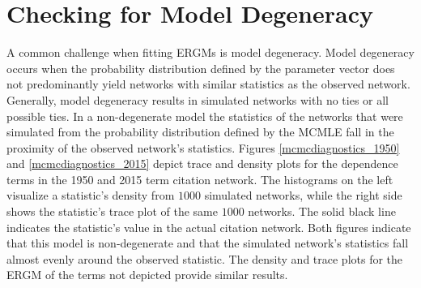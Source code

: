 \documentclass{cup-pan}
\begin{document}
\section{Checking for Model Degeneracy}

A common challenge when fitting ERGMs is model degeneracy. Model degeneracy occurs when the probability distribution defined by the parameter vector does not predominantly yield networks with similar statistics as the observed network. Generally, model degeneracy results in simulated networks with no ties or all possible ties. In a non-degenerate model the statistics of the networks that were simulated from the probability distribution defined by the MCMLE fall in the proximity of the observed network's statistics. Figures \ref{mcmcdiagnostics_1950} and \ref{mcmcdiagnostics_2015} depict trace and density plots for the dependence terms in the 1950 and 2015 term citation network. The histograms on the left visualize a statistic's density from $1000$ simulated networks, while the right side shows the statistic's trace plot of the same $1000$ networks. The solid black line indicates the statistic's value in the actual citation network. Both figures indicate that this model is non-degenerate and that the simulated network's statistics fall almost evenly around the observed statistic. The density and trace plots for the ERGM of the terms not depicted provide similar results.
\end{document}
